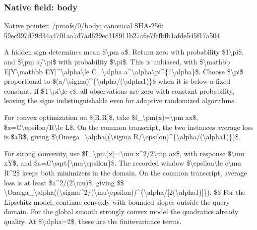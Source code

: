 \documentclass[10pt,a4paper]{article}
\begin{document}
\subsubsection{Native field: body}


Native pointer: /proofs/0/body; canonical SHA-256: 59ec997d79d34a4701aa7d7a\allowbreak{}d629ec318911b27a6e7fcfbf\allowbreak{}b1afde545f17a504


A hidden sign determines mean \$\textbackslash{}pm a\$. Return zero with probability \$1\textbackslash{}pi\$, and \$\textbackslash{}pm a/\textbackslash{}pi\$ with probability \$\textbackslash{}pi\$. This is unbiased, with
\$\textbackslash{}mathbb E|Y\textbackslash{}mathbb EY|\textasciicircum{}\textbackslash{}alpha\textbackslash{}le C\_\textbackslash{}alpha a\textasciicircum{}\textbackslash{}alpha\textbackslash{}pi\textasciicircum{}\{1\textbackslash{}alpha\}\$.
Choose \$\textbackslash{}pi\$ proportional to \$(a/\textbackslash{}sigma)\textasciicircum{}\{\textbackslash{}alpha/(\textbackslash{}alpha1)\}\$ when it is below a fixed constant. If \$T\textbackslash{}pi\textbackslash{}le c\$, all observations are zero with constant probability, leaving the signs indistinguishable even for adaptive randomized algorithms.

For convex optimization on \$[R,R]\$, take \$f\_\textbackslash{}pm(x)=\textbackslash{}pm ax\$, \$a=C\textbackslash{}epsilon/R\textbackslash{}le L\$. On the common transcript, the two instances average loss is \$aR\$, giving
\$\textbackslash{}Omega\_\textbackslash{}alpha((\textbackslash{}sigma R/\textbackslash{}epsilon)\textasciicircum{}\{\textbackslash{}alpha/(\textbackslash{}alpha1)\})\$.

For strong convexity, use \$f\_\textbackslash{}pm(x)=\textbackslash{}mu x\textasciicircum{}2/2\textbackslash{}mp ax\$, with response \$\textbackslash{}mu xY\$, and \$a=C\textbackslash{}sqrt\{\textbackslash{}mu\textbackslash{}epsilon\}\$. The recorded window \$\textbackslash{}epsilon\textbackslash{}le c\textbackslash{}mu R\textasciicircum{}2\$ keeps both minimizers in the domain. On the common transcript, average loss is at least \$a\textasciicircum{}2/(2\textbackslash{}mu)\$, giving
\$\$
\textbackslash{}Omega\_\textbackslash{}alpha((\textbackslash{}sigma\textasciicircum{}2/\allowbreak{}(\textbackslash{}mu\textbackslash{}epsilon))\textasciicircum{}\{\textbackslash{}alpha/[\allowbreak{}2(\textbackslash{}alpha1)]\}).
\$\$
For the Lipschitz model, continue convexly with bounded slopes outside the query domain. For the global smooth strongly convex model the quadratics already qualify. At \$\textbackslash{}alpha=2\$, these are the finitevariance terms.
\end{document}

